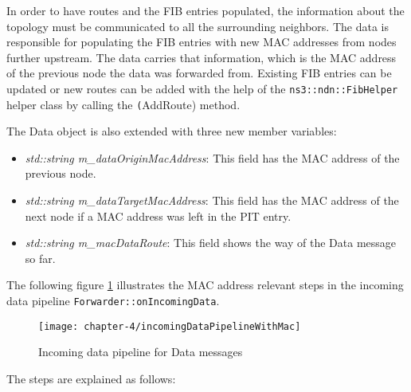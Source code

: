 In order to have routes and the FIB entries populated, the information about the topology must be communicated to all the surrounding neighbors. The data is responsible for populating the FIB entries with new MAC addresses from nodes further upstream. The data carries that information, which is the MAC address of the previous node the data was forwarded from. Existing FIB entries can be updated or new routes can be added with the help of the \texttt{ns3::ndn::FibHelper} helper class by calling the \texttt(AddRoute) method.

The Data object is also extended with three new member variables:

\begin{itemize}
\item \emph{std::string m\_dataOriginMacAddress}: This field has the MAC address of the previous node.
\item \emph{std::string m\_dataTargetMacAddress}: This field has the MAC address of the next node if a MAC address was left in the PIT entry.
\item \emph{std::string m\_macDataRoute}: This field shows the way of the Data message so far.
\end{itemize}

The following figure \ref{fig:incomingDataPipelineWithMac} illustrates the MAC address relevant steps in the incoming data pipeline \texttt{Forwarder::onIncomingData}.

\vspace{5mm} %

\begin{figure}[H]
  \centering
  \texttt{[image: chapter-4/incomingDataPipelineWithMac]}
  \caption{Incoming data pipeline for Data messages}
  \label{fig:incomingDataPipelineWithMac}
\end{figure}

\vspace{5mm} %

The steps are explained as follows:

